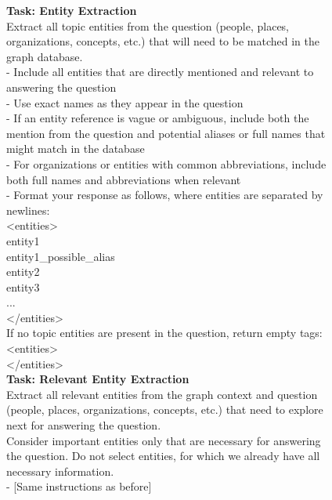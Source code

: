 
\begin{figure}
\begin{minipage}{1\columnwidth}
    \centering
\begin{tcolorbox}[title=\glink's Entity Extraction Prompt]
        \small
        \vspace{10pt}
        \textbf{Task: Entity Extraction} \\
        Extract all topic entities from the question (people, places, organizations, concepts, etc.) that will need to be matched in the graph database. \\
    - Include all entities that are directly mentioned and relevant to answering the question \\
    - Use exact names as they appear in the question \\
    - If an entity reference is vague or ambiguous, include both the mention from the question and potential aliases or full names that might match in the database \\
    - For organizations or entities with common abbreviations, include both full names and abbreviations when relevant \\
    - Format your response as follows, where entities are separated by newlines: \\

    <entities> \\
    entity1 \\
    entity1\_possible\_alias \\
    entity2 \\
    entity3 \\
    ... \\
    </entities>\\

    If no topic entities are present in the question, return empty tags:\\
    <entities>\\
    </entities>\\


    \textbf{Task: Relevant Entity Extraction}\\
    Extract all relevant entities from the graph context and question (people, places, organizations, concepts, etc.) that need to explore next for answering the question. \\
    Consider important entities only that are necessary for answering the question. Do not select entities, for which we already have all necessary information. \\
    - [Same instructions as before]


\end{tcolorbox}
\end{minipage}
\end{figure}
